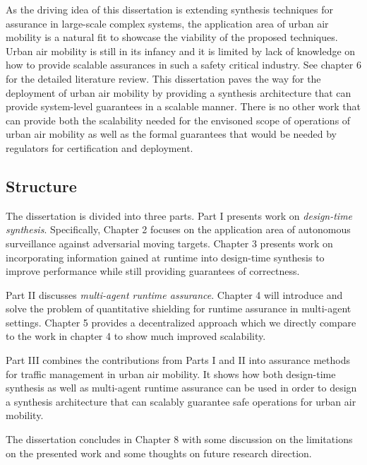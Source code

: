 As the driving idea of this dissertation is extending synthesis techniques for assurance in large-scale complex systems, the application area of urban air mobility is a natural fit to showcase the viability of the proposed techniques. Urban air mobility is still in its infancy and it is limited by lack of knowledge on how to provide scalable assurances in such a safety critical industry. See chapter 6 for the detailed literature review. This dissertation paves the way for the deployment of urban air mobility by providing a synthesis architecture that can provide system-level guarantees in a scalable manner. There is no other work that can provide both the scalability needed for the envisoned scope of operations of urban air mobility as well as the formal guarantees that would be needed by regulators for certification and deployment. 



\subsection{Structure}

The dissertation is divided into three parts. Part I presents work on \emph{design-time synthesis}. Specifically, Chapter 2 focuses on the application area of autonomous surveillance against adversarial moving targets. Chapter 3 presents work on incorporating information gained at runtime into design-time synthesis to improve performance while still providing guarantees of correctness. 

Part II discusses \emph{multi-agent runtime assurance}. Chapter 4 will introduce and solve the problem of quantitative shielding for runtime assurance in multi-agent settings. Chapter 5 provides a decentralized approach which we directly compare to the work in chapter 4 to show much improved scalability. 

Part III combines the contributions from Parts I and II into assurance methods for traffic management in urban air mobility. It shows how both design-time synthesis as well as multi-agent runtime assurance can be used in order to design a synthesis architecture that can scalably guarantee safe operations for urban air mobility. 

The dissertation concludes in Chapter 8 with some discussion on the limitations on the presented work and some thoughts on future research direction. 

\setcounter{page}{10}



